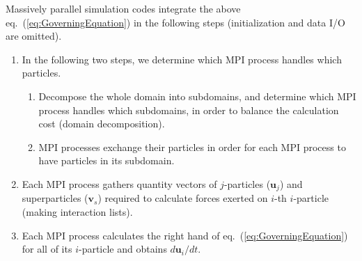 Massively parallel simulation codes integrate the above
eq.~(\ref{eq:GoverningEquation}) in the following steps (initialization
and data I/O are omitted).
\begin{enumerate}
\item In the following two steps, we determine which MPI process
  handles which particles.
  \label{item:LoadBalance}
  \begin{enumerate}
  \item Decompose the whole domain into subdomains, and determine
    which MPI process handles which subdomains, in order to balance
    the calculation cost (domain decomposition).
  \item MPI processes exchange their particles in order for each MPI
    process to have particles in its subdomain.
  \end{enumerate}

\item Each MPI process gathers quantity vectors of $j$-particles
  ($\bm{u}_j$) and superparticles ($\bm{v}_s$) required to calculate
  forces exerted on $i$-th $i$-particle (making interaction lists).
  \label{item:MakeInteractionList}

  \item Each MPI process calculates the right hand of
    eq.~(\ref{eq:GoverningEquation}) for all of its $i$-particle and
    obtains $d\bm{u}_i/dt$.
  \label{item:CalcInteraction}


\end{enumerate}
